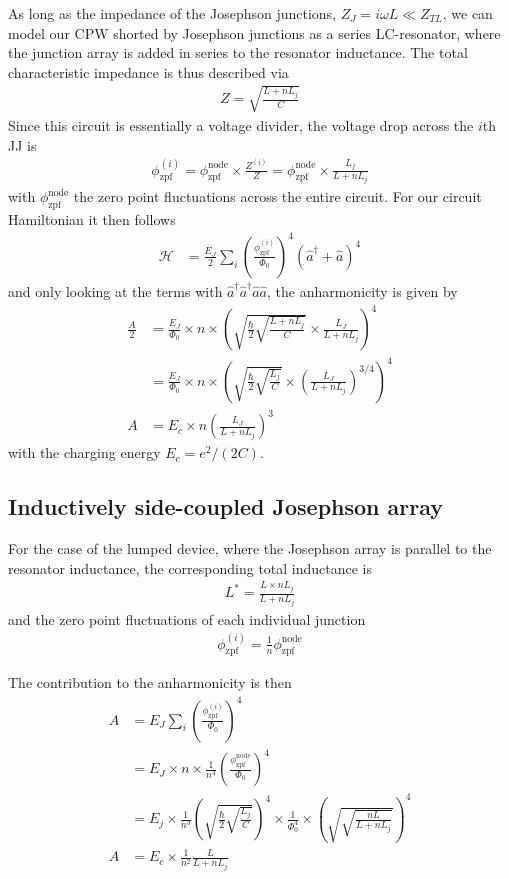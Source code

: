 As long as the impedance of the Josephson junctions, $Z_J=i\omega L\ll Z_{TL}$, we can model our CPW shorted by Josephson junctions as a series LC-resonator, where the junction array is added in series to the resonator inductance.
The total characteristic impedance is thus described via
\begin{align}
Z=\sqrt{\frac{L+nL_j}{C}}
\end{align}
Since this circuit is essentially a voltage divider, the voltage drop across the $i$th JJ is
\begin{align}
\phi_\text{zpf}^{(i)} = \phi_\text{zpf}^\text{node}\times\frac{Z^{(i)}}{Z}=\phi_\text{zpf}^\text{node}\times\frac{L_j}{L+n L_j}
\end{align}
with $\phi_\text{zpf}^\text{node}$ the zero point fluctuations across the entire circuit.
For our circuit Hamiltonian it then follows 
\begin{align}
\mathcal{H}&= \frac{E_J}{2} \sum_{i} \left( \frac{\phi_\text{zpf}^{(i)}}{\Phi_0} \right)^4 \left(\hat{a}^\dagger+\hat{a}\right)^4
\end{align}
and only looking at the terms with $\hat{a}^\dagger \hat{a}^\dagger \hat{a} \hat{a}$, the anharmonicity is given by
\begin{align}
\frac{A}{2} &=\frac{E_J}{\Phi_0}\times n \times \left(\sqrt{\frac{\hbar}{2} \sqrt{\frac{L+nL_j}{C}}}\times \frac{L_J}{L+nL_j}\right)^4  \\
&= \frac{E_J}{\Phi_0}\times n \times \left(\sqrt{\frac{\hbar}{2} \sqrt{\frac{L_j}{C}}}\times \left(\frac{L_J}{L+nL_j}\right)^{3/4}\right)^4  \\
A &= E_c \times n \left(\frac{L_J}{L+nL_j}\right)^{3}
\end{align}
with the charging energy $E_c=e^2/(2C)$.

\subsection{Inductively side-coupled Josephson array}\label{sec:lumped}

For the case of the lumped device, where the Josephson array is parallel to the resonator inductance, the corresponding total inductance is
\begin{align}
L^*=\frac{L \times nL_j}{L+nL_j}
\end{align}
and the zero point fluctuations of each individual junction
\begin{align}
\phi_\text{zpf}^{(i)}=\frac{1}{n}\phi_\text{zpf}^\text{node}
\end{align}

The contribution to the anharmonicity is then
\begin{align}
A&=E_J \sum_{i} \left( \frac{\phi_\text{zpf}^{(i)}}{\Phi_0} \right)^4 \\
&=E_J \times n \times \frac{1}{n^4} \left( \frac{\phi_\text{zpf}^\text{node}}{\Phi_0} \right)^4 \\
&= E_j\times\frac{1}{n^3} \left( \sqrt{\frac{\hbar}{2} \sqrt{\frac{L_j}{C}} } \right)^4 \times \frac{1}{\Phi_0^4} \times \left( \sqrt{\sqrt{\frac{nL}{L+nL_j}}} \right)^4 \\
A&= E_c \times \frac{1}{n^2}\frac{L}{L+nL_j}
\end{align}

%